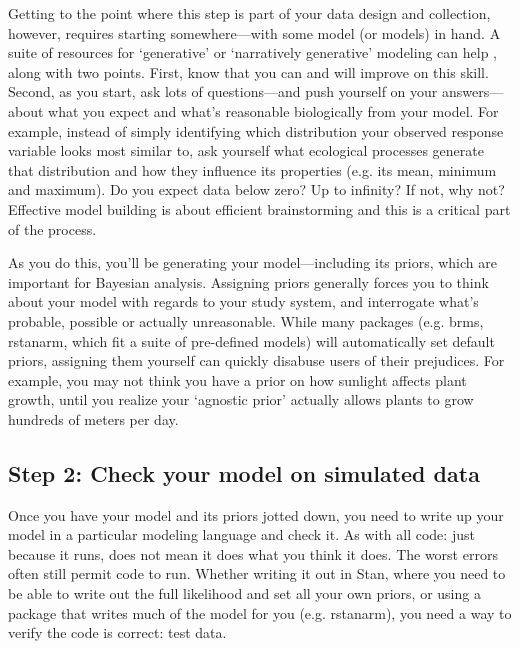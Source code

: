 \documentclass[11pt]{article}
\begin{document}
Getting to the point where this step is part of your data design and collection, however, requires starting somewhere---with some model (or models) in hand. A suite of resources for `generative' or `narratively generative' modeling can help \citep{statrethink,betangen}, along with two points. First, know that you can and will improve on this skill. Second, as you start, ask lots of questions---and push yourself on your answers---about what you expect and what's reasonable biologically from your model. For example, instead of simply identifying which distribution your observed response variable looks most similar to, ask yourself what ecological processes generate that distribution and how they influence its properties (e.g. its mean, minimum and maximum). Do you expect data below zero? Up to infinity? If not, why not? Effective model building is about efficient brainstorming and this is a critical part of the process. 

As you do this, you'll be generating your model---including its priors, which are important for Bayesian analysis. Assigning priors generally forces you to think about your model with regards to your study system, and interrogate what's probable, possible or actually unreasonable. While many packages (e.g. \textsf{brms, rstanarm}, which fit a suite of pre-defined models) will automatically set default priors, assigning them yourself can quickly disabuse users of their prejudices. For example, you may not think you have a prior on how sunlight affects plant growth, until you realize your `agnostic prior' actually allows plants to grow hundreds of meters per day. 

\subsection*{Step 2: Check your model on simulated data} 

Once you have your model and its priors jotted down, you need to write up your model in a particular modeling language and check it. As with all code: just because it runs, does not mean it does what you think it does. The worst errors often still permit code to run. Whether writing it out in \textsf{Stan}, where you need to be able to write out the full likelihood and set all your own priors, or using a package that writes much of the model for you (e.g. \textsf{rstanarm}), you need a way to verify the code is correct: test data.
\end{document}
